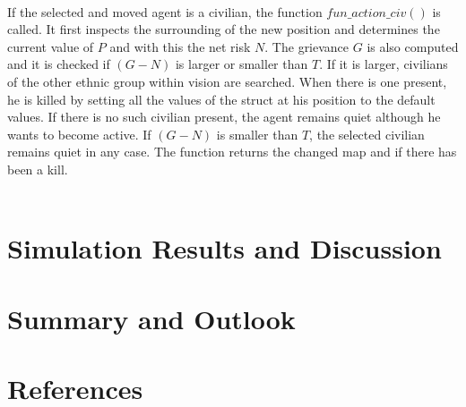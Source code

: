\documentclass[11pt]{article}
\begin{document}
\\
If the selected and moved agent is a civilian, the function $fun\_action\_civ()$ is called. It first inspects the surrounding of the new position and determines the current value of $P$ and with this the net risk $N$. The grievance $G$ is also computed and it is checked if $(G-N)$ is larger or smaller than $T$. If it is larger, civilians of the other ethnic group within vision are searched. When there is one present, he is killed by setting all the values of the struct at his position to the default values. If there is no such civilian present, the agent remains quiet although he wants to become active. If $(G-N)$ is smaller than $T$, the selected civilian remains quiet in any case. The function returns the changed map and if there has been a kill.\\
\\

\section{Simulation Results and Discussion}

\section{Summary and Outlook}

\section{References}
\end{document}
